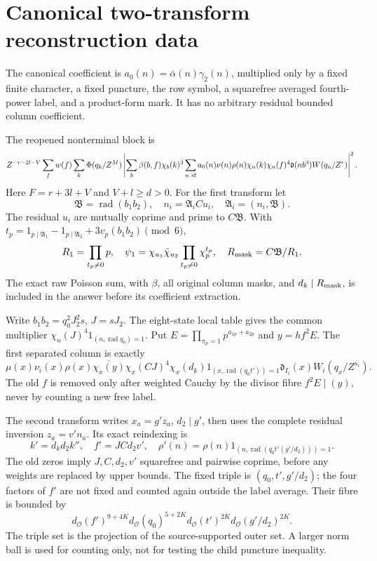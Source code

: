 \documentclass[12pt]{article}
\begin{document}
\section{Canonical two-transform reconstruction data}
The canonical coefficient is
\(a_0(n)=\bar\alpha(n)\gamma_2(n)\), multiplied only by a
fixed finite character, a fixed puncture, the row symbol,
a squarefree averaged fourth-power label, and a product-form mark.
It has no arbitrary residual bounded column coefficient.

The reopened nonterminal block is
\[
 Z^{-r-2l-V}\sum_f w(f)\sum_k\Phi(q_k/Z^M)
 \left|\sum_b\beta(b,f)\chi_b(k)^3
       \sum_{n\ {\rm sf}}a_0(n)\nu(n)\rho(n)
          \chi_n(k)\chi_n(f)^4
          \mathfrak d(nb^3)W(q_n/Z^r)\right|^2 .
\]
Here \(F=r+3l+V\) and \(V+l\ge d>0\).
For the first transform let
\[
 \mathfrak B=\operatorname{rad}(b_1b_2),\quad
 n_i=\mathfrak A_i C u_i,\quad
 \mathfrak A_i=(n_i,\mathfrak B).
\]
The residual \(u_i\) are mutually coprime and prime to
\(C\mathfrak B\).  With
\(t_p=1_{p\mid\mathfrak A_1}-1_{p\mid\mathfrak A_2}
          +3v_p(b_1b_2)\pmod6\),
\[
 R_1=\prod_{t_p\ne0}p,\quad
 \psi_1=\chi_{u_1}\bar\chi_{u_2}
            \prod_{t_p\ne0}\chi_p^{t_p},\quad
 R_{\rm mask}=C\mathfrak B/R_1.
\]
The exact raw Poisson sum, with \(\beta\), all original column
masks, and \(d_k\mid R_{\rm mask}\), is included in the answer
before its coefficient extraction.

Write
\(b_1b_2=q_0^2J_2^2s\), \(J=sJ_2\).
The eight-state local table gives the common multiplier
\(\chi_n(J)^4 1_{(n,\operatorname{rad}q_0)=1}\).
Put \(E=\prod_{\pi_p=1}p^{a_{1p}+a_{2p}}\) and
\(y=hf^2E\).  The first separated column is exactly
\[
 \mu(x)\nu_i(x)\rho(x)\overline{\chi_x(y)}
 \chi_x(CJ)^4\chi_x(d_k)
 1_{(x,\operatorname{rad}(q_0t'))=1}
 \mathfrak d_{I_i}(x)W_i(q_x/Z^{s_i}).
\]
The old \(f\) is removed only after weighted Cauchy by the divisor
fibre \(f^2E\mid(y)\), never by counting a new free label.

The second transform writes \(x_a=g'z_a\), \(d_2\mid g'\),
then uses the complete residual inversion \(z_a=v'n_a\).
Its exact reindexing is
\[
 k'=d_kd_2k'',\quad f'=JCd_2v',\quad
 \rho'(n)=\rho(n)1_{(n,\operatorname{rad}(q_0t'(g'/d_2)))=1}.
\]
The old zeros imply \(J,C,d_2,v'\) squarefree and pairwise
coprime, before any weights are replaced by upper bounds.
The fixed triple is \((q_0,t',g'/d_2)\); the four factors of
\(f'\) are not fixed and counted again outside the label average.
Their fibre is bounded by
\[
 d_{\mathcal O}(f')^{9+4K}
 d_{\mathcal O}(q_0)^{5+2K}
 d_{\mathcal O}(t')^{2K}
 d_{\mathcal O}(g'/d_2)^{2K}.
\]
The triple set is the projection of the source-supported outer set.
A larger norm ball is used for counting only, not for testing
the child puncture inequality.
\end{document}
